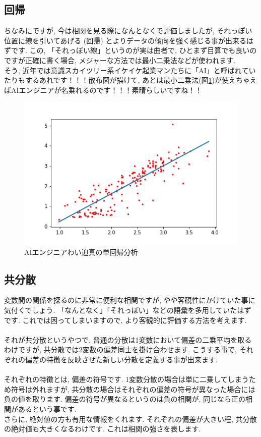 \documentclass[11pt,a4paper]{jreport}
\begin{document}
\subsection{回帰}
ちなみにですが, 今は相関を見る際になんとなくで評価しましたが, それっぽい位置に線を引いてあげる (回帰) とよりデータの傾向を強く感じる事が出来るはずです. この, 「それっぽい線」というのが実は曲者で, ひとまず目算でも良いのですが正確に書く場合, メジャーな方法では最小二乗法などが使われます. \\
そう, 近年では意識スカイツリー系イケイケ起業マンたちに「AI」と呼ばれていたりもするあれです！！！散布図が描けて, あとは最小二乗法(図\ref{im:predict})が使えちゃえばAIエンジニアが名乗れるのです！！！素晴らしいですね！！\\

\begin{figure}[H]
\label{im:predict}
  \centering
  \includegraphics[width=120mm,bb=0 0 432 288]{figures/predict.png}
  \caption{AIエンジニアわい迫真の単回帰分析}
\end{figure}

\subsection{共分散}
変数間の関係を探るのに非常に便利な相関ですが, やや客観性にかけていた事に気付くでしょう. 「なんとなく」「それっぽい」などの語彙を多用していたはずです. これでは困ってしまいますので, より客観的に評価する方法を考えます.\\
\\
それが共分散というやつで, 普通の分散は1変数において偏差の二乗平均を取るわけですが, 共分散では2変数の偏差同士を掛け合わせます. こうする事で, それぞれの偏差の特徴を反映させた新しい分散を定義する事が出来ます. \\
\\
それぞれの特徴とは, 偏差の符号です. 1変数分散の場合は単に二乗してしまうため符号は外れますが, 共分散の場合はそれぞれの偏差の符号が異なった場合には負の値を取ります. 偏差の符号が異なるというのは負の相関が, 同じなら正の相関があるという事です.\\
さらに, 絶対値の方も有用な情報をくれます. それぞれの偏差が大きい程, 共分散の絶対値も大きくなるわけです. これは相関の強さを表します.\\
\end{document}
